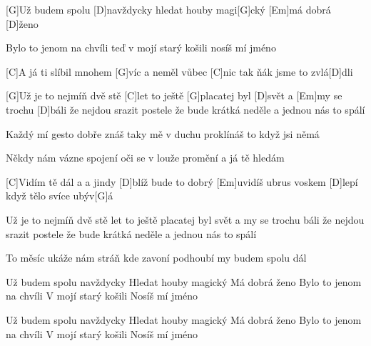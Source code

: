 
[G]Už budem spolu [D]navždycky
hledat houby magi[G]cký
[Em]má dobrá [D]\null ženo

Bylo to jenom na chvíli
teď v mojí starý košili
nosíš mí jméno

[C]A já ti slíbil mnohem [G]víc
a neměl vůbec [C]nic
tak ňák jsme to zvlá[D]dli

[G]Už je to nejmíň dvě stě [C]let
to ještě [G]placatej byl [D]svět
a [Em]my se trochu [D]báli
že nejdou srazit postele
že bude krátká neděle
a jednou nás to spálí

Každý mí gesto dobře znáš
taky mě v duchu proklínáš
to když jsi němá 

Někdy nám vázne spojení
oči se v louže promění 
a já tě hledám
\slpc

[C]Vidím tě dál a a jindy [D]blíž
bude to dobrý [Em]uvidíš
ubrus voskem [D]lepí 
když tělo svíce ubýv[G]\null á 

Už je to nejmíň dvě stě let
to ještě placatej byl svět
a my se trochu báli
že nejdou srazit postele
že bude krátká neděle
a jednou nás to spálí

To měsíc ukáže nám stráň 
kde zavoní podhoubí
my budem spolu dál

Už budem spolu navždycky 
Hledat houby magický
Má dobrá ženo
Bylo to jenom na chvíli 
V mojí starý košili 
Nosíš mí jméno

Už budem spolu navždycky 
Hledat houby magický
Má dobrá ženo
Bylo to jenom na chvíli 
V mojí starý košili 
Nosíš mí jméno


